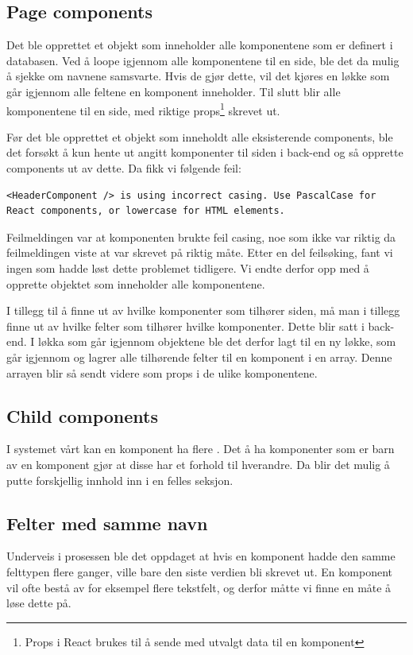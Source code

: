\subsection{Page components}

Det ble opprettet et objekt som inneholder alle komponentene som er definert i databasen. Ved å loope igjennom alle komponentene til en side, ble det da mulig å sjekke om navnene samsvarte. Hvis de gjør dette, vil det kjøres en løkke som går igjennom alle feltene en komponent inneholder. Til slutt blir alle komponentene til en side, med riktige props\footnote{Props i React brukes til å sende med utvalgt data til en komponent} skrevet ut.  

Før det ble opprettet et objekt som inneholdt alle eksisterende components, ble det forsøkt å kun hente ut angitt komponenter til siden i back-end og så opprette components ut av dette. Da fikk vi følgende feil:
\begin{lstlisting}
<HeaderComponent /> is using incorrect casing. Use PascalCase for React components, or lowercase for HTML elements.
\end{lstlisting}

Feilmeldingen var at komponenten brukte feil casing, noe som ikke var riktig da feilmeldingen viste at  var skrevet på riktig måte. Etter en del feilsøking, fant vi ingen som hadde løst dette problemet tidligere. Vi endte derfor opp med å opprette objektet som inneholder alle komponentene. 

I tillegg til å finne ut av hvilke komponenter som tilhører siden, må man i tillegg finne ut av hvilke felter som tilhører hvilke komponenter. Dette blir satt i back-end. I løkka som går igjennom objektene ble det derfor lagt til en ny løkke, som går igjennom og lagrer alle tilhørende felter til en komponent i en array. Denne arrayen blir så sendt videre som props i de ulike komponentene.

\subsection{Child components}
I systemet vårt kan en komponent ha flere . Det å ha komponenter som er barn av en komponent gjør at disse har et forhold til hverandre. Da blir det mulig å putte forskjellig innhold inn i en felles seksjon.

\subsection{Felter med samme navn}
Underveis i prosessen ble det oppdaget at hvis en komponent hadde den samme felttypen flere ganger, ville bare den siste verdien bli skrevet ut. En komponent vil ofte bestå av for eksempel flere tekstfelt, og derfor måtte vi finne en måte å løse dette på.


